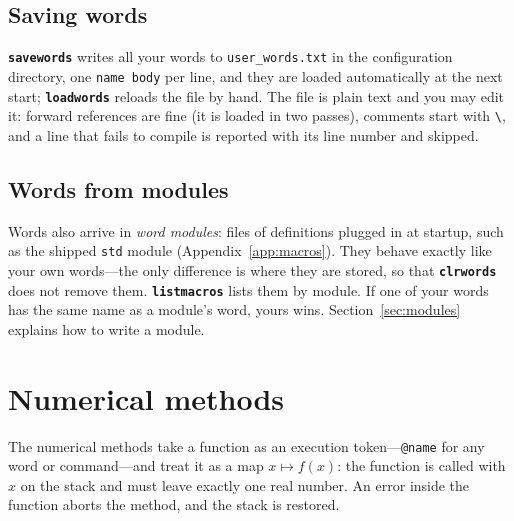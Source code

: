 \documentclass[11pt,letterpaper]{article}
\newcommand{\code}[1]{\texttt{#1}}
\newcommand{\cmd}[1]{\texttt{\textbf{#1}}}
\begin{document}
\subsection{Saving words}

\cmd{savewords} writes all your words to \code{user\_words.txt} in the configuration directory, one \code{name body} per line, and they are loaded automatically at the next start; \cmd{loadwords} reloads the file by hand. The file is plain text and you may edit it: forward references are fine (it is loaded in two passes), comments start with \code{\textbackslash}, and a line that fails to compile is reported with its line number and skipped.

\subsection{Words from modules}

Words also arrive in \emph{word modules}: files of definitions plugged in at startup, such as the shipped \code{std} module (Appendix~\ref{app:macros}). They behave exactly like your own words---the only difference is where they are stored, so that \cmd{clrwords} does not remove them. \cmd{listmacros} lists them by module. If one of your words has the same name as a module's word, yours wins. Section~\ref{sec:modules} explains how to write a module.

\section{Numerical methods}
\label{sec:numerics}

The numerical methods take a function as an execution token---\code{@name} for any word or command---and treat it as a map $x \mapsto f(x)$: the function is called with $x$ on the stack and must leave exactly one real number. An error inside the function aborts the method, and the stack is restored.
\end{document}
